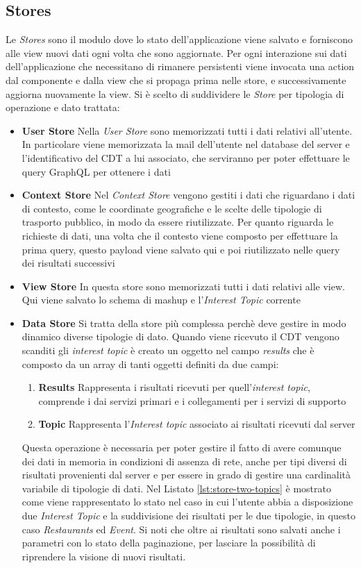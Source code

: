 \subsection{Stores}\label{sec:action-store}
Le \emph{Stores} sono il modulo dove lo stato dell'applicazione viene salvato e forniscono alle view nuovi dati ogni volta che sono aggiornate. 
Per ogni interazione sui dati dell'applicazione che necessitano di rimanere persistenti viene invocata una action dal componente e dalla view che si propaga prima nelle store, e successivamente aggiorna nuovamente la view.
Si è scelto di suddividere le \emph{Store} per tipologia di operazione e dato trattata:
\begin{itemize}
	\item  \textbf{User Store} Nella \emph{User Store} sono memorizzati tutti i dati relativi all'utente. In particolare viene memorizzata la mail dell'utente nel database del server e l'identificativo del CDT a lui associato, che serviranno per poter effettuare le query GraphQL per ottenere i dati
	\item \textbf{Context Store} Nel \emph{Context Store} vengono gestiti i dati che riguardano i dati di contesto, come le coordinate geografiche e le scelte delle tipologie di trasporto pubblico, in modo da essere riutilizzate. Per quanto riguarda le richieste di dati, una volta che il contesto viene composto per effettuare la prima query, questo payload viene salvato qui e poi riutilizzato nelle query dei risultati successivi
	\item \textbf{View Store} In questa store sono memorizzati tutti i dati relativi alle view. Qui viene salvato lo schema di mashup e l'\emph{Interest Topic} corrente
	\item \textbf{Data Store} Si tratta della store più complessa perchè deve gestire in modo dinamico diverse tipologie di dato. Quando viene ricevuto il CDT vengono scanditi gli \emph{interest topic} è creato un oggetto nel campo \emph{results} che è composto da un array di tanti oggetti definiti da due campi:
	\begin{enumerate}
		\item \textbf{Results} Rappresenta i risultati ricevuti per quell'\emph{interest topic}, comprende i dai servizi primari e i collegamenti per i servizi di supporto
		\item \textbf{Topic} Rappresenta l'\emph{Interest topic} associato ai risultati ricevuti dal server
	\end{enumerate}
	Questa operazione è necessaria per poter gestire il fatto di avere comunque dei dati in memoria in condizioni di assenza di rete, anche per tipi diversi di risultati provenienti dal server e per essere in grado di gestire una cardinalità variabile di tipologie di dati. Nel Listato \ref{lst:store-two-topics} è mostrato come viene rappresentato lo stato nel caso in cui l'utente abbia a disposizione due \emph{Interest Topic} e la suddivisione dei risultati per le due tipologie, in questo caso \emph{Restaurants} ed \emph{Event}. Si noti che oltre ai risultati sono salvati anche i parametri con lo stato della paginazione, per lasciare la possibilità di riprendere la visione di nuovi risultati.
	
\end{itemize}

